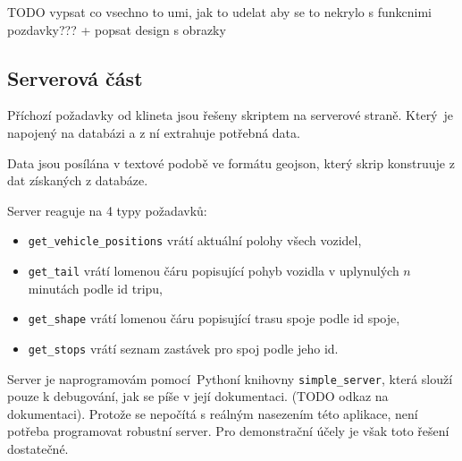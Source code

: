 TODO vypsat co vsechno to umi, jak to udelat aby se to nekrylo s funkcnimi pozdavky??? + popsat design s obrazky


\subsection{Serverová část}

Příchozí požadavky od klineta jsou řešeny skriptem na serverové straně. Který je napojený na databázi a z ní extrahuje potřebná data.

\bigbreak

Data jsou posílána v textové podobě ve formátu \gls{geojson}, který skrip konstruuje z dat získaných z databáze.

\bigbreak

Server reaguje na 4 typy požadavků:

\begin{itemize}
	\item \verb-get_vehicle_positions- vrátí aktuální polohy všech vozidel,

	\item \verb-get_tail- vrátí lomenou čáru popisující pohyb vozidla v uplynulých $n$ minutách podle id tripu,

	\item \verb-get_shape- vrátí lomenou čáru popisující trasu spoje podle id spoje,

	\item \verb-get_stops- vrátí seznam zastávek pro spoj podle jeho id.
\end{itemize}

\bigbreak

Server je naprogramovám pomocí Pythoní knihovny \verb-simple_server-, která slouží pouze k debugování, jak se píše v její dokumentaci. (TODO odkaz na dokumentaci). Protože se nepočítá s reálným nasezením této aplikace, není potřeba programovat robustní server. Pro demonstrační účely je však toto řešení dostatečné.























